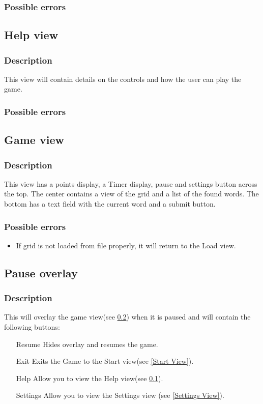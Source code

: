 \documentclass{project}
\begin{document}
\subsubsection{Possible errors}

\subsection{Help view} \label{Help View}
\subsubsection{Description}
This view will contain details on the controls and how the user can play the game.
\subsubsection{Possible errors}

\subsection{Game view} \label{Game View}
\subsubsection{Description}
This view has a points display, a Timer display, pause and settings button across the top. The center contains a view of the grid and a list of the found words. The bottom has a text field with the current word and a submit button.
\subsubsection{Possible errors}
\begin{itemize}
\item If grid is not loaded from file properly, it will return to the Load view.
\end{itemize}

\subsection{Pause overlay} \label{Pause Overlay}
\subsubsection{Description}
This will overlay the game view(see \ref{Game View}) when it is paused and will contain the following buttons:
\begin{itemize}
\item[Resume]Hides overlay and resumes the game.
\item[Exit] Exits the Game to the Start view(see \ref{Start View}).
\item[Help] Allow you to view the Help view(see \ref{Help View}).
\item[Settings] Allow you to view the Settings view (see \ref{Settings View}).
\end{itemize}
\end{document}
